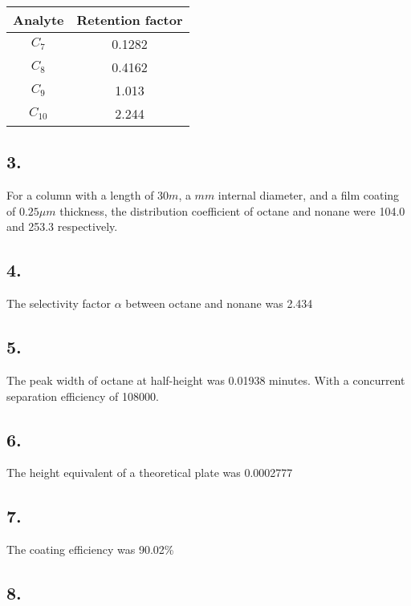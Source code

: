 \documentclass[a4paper, british]{article}
\begin{document}
\begin{table}[H]
    \centering
    \caption{}
    \vspace*{2mm}
    \label{tab:k}
    \begin{tabular}{cc}
    \toprule
    Analyte & Retention factor \\ \midrule
    \(C_7\) & 0.1282 \\
    \(C_8\) & 0.4162 \\
    \(C_9\) & 1.013 \\
    \(C_{10}\) & 2.244 \\ \bottomrule
    \end{tabular}
\end{table}

\subsection*{3.}

For a column with a length of \(30 m \), a \( mm\)  internal
diameter, and a film coating of \(0.25 \mu m\) thickness, the distribution coefficient of octane and nonane were 104.0 and 253.3 respectively.

\subsection*{4.}

The selectivity factor \(\alpha\) between octane and nonane was 2.434

\subsection*{5.}

The peak width of octane at half-height was 0.01938 minutes. With a concurrent separation efficiency of 108000.

\subsection*{6.}

The height equivalent of a theoretical plate was 0.0002777

\subsection*{7.}

The coating efficiency was 90.02\%

\subsection*{8.}
\end{document}
